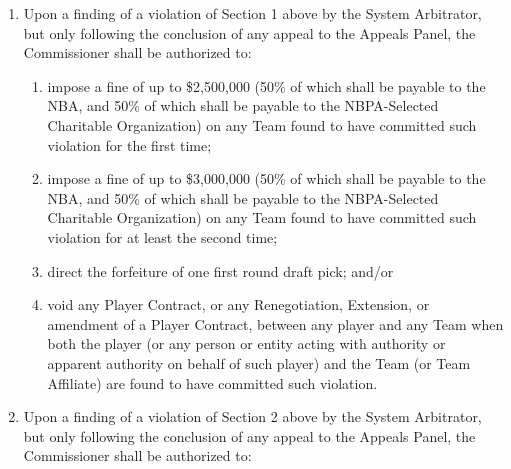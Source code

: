 \documentclass[
]{book}
\providecommand{\tightlist}{%
  \setlength{\itemsep}{0pt}\setlength{\parskip}{0pt}}
\begin{document}
\begin{enumerate}
\def\labelenumi{(\alph{enumi})}
\tightlist
\item
  Upon a finding of a violation of Section 1 above by the System Arbitrator, but only following the conclusion of any appeal to the Appeals Panel, the Commissioner shall be authorized to:

  \begin{enumerate}
  \def\labelenumii{(\roman{enumii})}
  \tightlist
  \item
    impose a fine of up to \$2,500,000 (50\% of which shall be payable to the NBA, and 50\% of which shall be payable to the NBPA-Selected Charitable Organization) on any Team found to have committed such violation for the first time;
  \item
    impose a fine of up to \$3,000,000 (50\% of which shall be payable to the NBA, and 50\% of which shall be payable to the NBPA-Selected Charitable Organization) on any Team found to have committed such violation for at least the second time;
  \item
    direct the forfeiture of one first round draft pick; and/or
  \item
    void any Player Contract, or any Renegotiation, Extension, or amendment of a Player Contract, between any player and any Team when both the player (or any person or entity acting with authority or apparent authority on behalf of such player) and the Team (or Team Affiliate) are found to have committed such violation.
  \end{enumerate}
\item
  Upon a finding of a violation of Section 2 above by the System Arbitrator, but only following the conclusion of any appeal to the Appeals Panel, the Commissioner shall be authorized to:


\end{enumerate}
\end{document}
